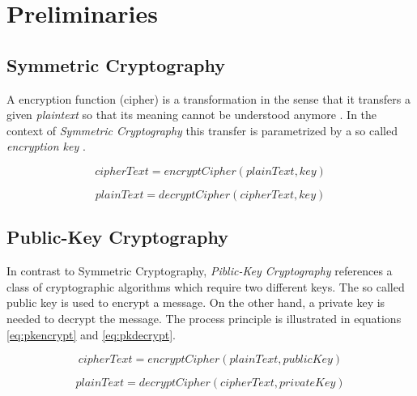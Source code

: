 \chapter{Preliminaries}

\section{Symmetric Cryptography} 

A encryption function (cipher) is a transformation in the sense that it transfers a given \textit{plaintext} so that its meaning cannot be understood anymore \citep[section 1.4]{HAC}. In the context of \textit{Symmetric Cryptography} this transfer is parametrized by a so called \textit{encryption key}  \citep[section 1.5]{HAC}.

\begin{equation} \label{eq:skencrypt}
	cipherText = encryptCipher(plainText, key)
\end{equation}

\begin{equation} \label{eq:skdecrypt}
	plainText = decryptCipher(cipherText, key)
\end{equation}


\section{Public-Key Cryptography}

In contrast to  {Symmetric Cryptography}, \textit{Piblic-Key Cryptography} references a class of cryptographic algorithms which require two different keys. \citep[section 1.8]{HAC} The so called public key is used to encrypt a message. On the other hand, a private key is needed to decrypt the message. The process principle is illustrated in equations \ref{eq:pkencrypt} and \ref{eq:pkdecrypt}. 

\begin{equation} \label{eq:pkencrypt}
	cipherText = encryptCipher(plainText, publicKey)
\end{equation}

\begin{equation} \label{eq:pkdecrypt}
	plainText = decryptCipher(cipherText, privateKey)
\end{equation}


